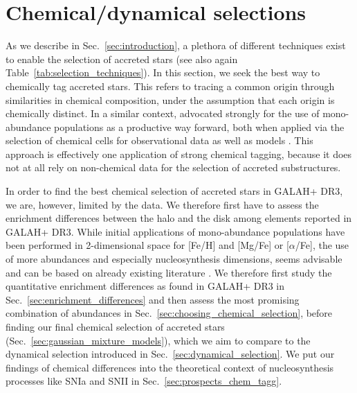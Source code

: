 \documentclass[fleqn,usenatbib]{mnras}
\begin{document}
\section{Chemical/dynamical selections} \label{sec:our_selection_techniques}

As we describe in Sec.~\ref{sec:introduction}, a plethora of different techniques exist to enable the selection of accreted stars (see also again Table~\ref{tab:selection_techniques}). In this section, we seek the best way to chemically tag \citep{FreemanBlandHawthorn2002, Ting2015} accreted stars. This refers to tracing a common origin through similarities in chemical composition, under the assumption that each origin is chemically distinct. In a similar context, \citet{Rix2013} advocated strongly for the use of mono-abundance populations as a productive way forward, both when applied via the selection of chemical cells \citep{Ting2015, Lu2021} for observational data \citep[e.g.][]{Bovy2012, Bovy2012b, Bovy2016} as well as models \citep[e.g.][]{Ting2013,Bird2013, Minchev2017}. This approach is effectively one application of strong chemical tagging, because it does not at all rely on non-chemical data for the selection of accreted substructures.

In order to find the best chemical selection of accreted stars in GALAH+ DR3, we are, however, limited by the data. We therefore first have to assess the enrichment differences between the halo and the disk among elements reported in GALAH+ DR3. While initial applications of mono-abundance populations have been performed in 2-dimensional space \citep[e.g.][]{Navarro2011,DiMatteo2019,Carollo2021} for [Fe/H] and [Mg/Fe] or [$\alpha$/Fe], the use of more abundances and especially nucleosynthesis dimensions, seems advisable and can be based on already existing literature \citep{Nissen2010,Ting2012, Hawkins2015, Hayes2018, Das2020}. We therefore first study the quantitative enrichment differences as found in GALAH+ DR3 in Sec.~\ref{sec:enrichment_differences} and then assess the most promising combination of abundances in Sec.~\ref{sec:choosing_chemical_selection}, before finding our final chemical selection of accreted stars (Sec.~\ref{sec:gaussian_mixture_models}), which we aim to compare to the dynamical selection introduced in Sec.~\ref{sec:dynamical_selection}. We put our findings of chemical differences into the theoretical context of nucleosynthesis processes like SNIa and SNII in Sec.~\ref{sec:prospects_chem_tagg}.
\end{document}
